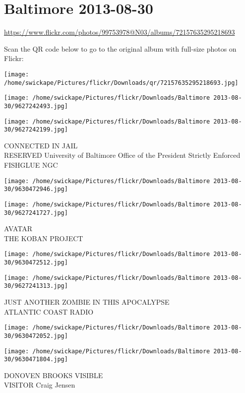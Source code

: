 \documentclass[10pt,letterpaper]{article}
\title{}
\author{}
\date{}
\begin{document}
\section*{Baltimore 2013-08-30}

\url{https://www.flickr.com/photos/99753978@N03/albums/72157635295218693}

Scan the QR code below to go to the original album with full-size photos on Flickr:

\texttt{[image: /home/swickape/Pictures/flickr/Downloads/qr/72157635295218693.jpg]}
\pagebreak

\texttt{[image: /home/swickape/Pictures/flickr/Downloads/Baltimore 2013-08-30/9627242493.jpg]}

\vspace{0.25in}
\texttt{[image: /home/swickape/Pictures/flickr/Downloads/Baltimore 2013-08-30/9627242199.jpg]}

CONNECTED IN JAIL\\
RESERVED University of Baltimore Office of the President Strictly Enforced FISHGLUE NGC
\pagebreak

\texttt{[image: /home/swickape/Pictures/flickr/Downloads/Baltimore 2013-08-30/9630472946.jpg]}

\vspace{0.25in}
\texttt{[image: /home/swickape/Pictures/flickr/Downloads/Baltimore 2013-08-30/9627241727.jpg]}

AVATAR\\
THE KOBAN PROJECT
\pagebreak

\texttt{[image: /home/swickape/Pictures/flickr/Downloads/Baltimore 2013-08-30/9630472512.jpg]}

\vspace{0.25in}
\texttt{[image: /home/swickape/Pictures/flickr/Downloads/Baltimore 2013-08-30/9627241313.jpg]}

JUST ANOTHER ZOMBIE IN THIS APOCALYPSE\\
ATLANTIC COAST RADIO
\pagebreak

\texttt{[image: /home/swickape/Pictures/flickr/Downloads/Baltimore 2013-08-30/9630472052.jpg]}

\vspace{0.25in}
\texttt{[image: /home/swickape/Pictures/flickr/Downloads/Baltimore 2013-08-30/9630471804.jpg]}

DONOVEN BROOKS VISIBLE\\
VISITOR Craig Jensen
\pagebreak
\end{document}

